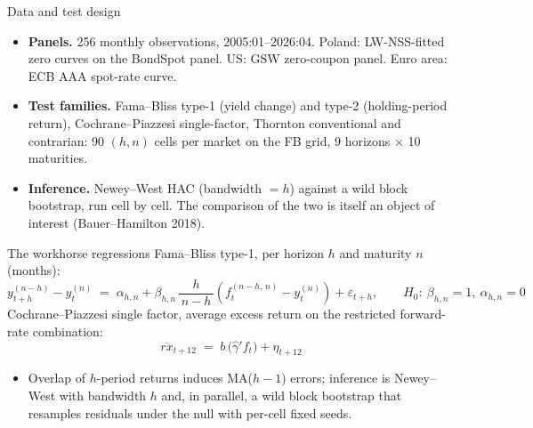 \documentclass[aspectratio=169,11pt]{beamer}
\begin{document}
\begin{frame}{Data and test design}
  \small
  \begin{itemize}
    \item \textbf{Panels.} 256 monthly observations, 2005:01--2026:04. Poland:
          LW-NSS-fitted zero curves on the BondSpot panel. US: GSW zero-coupon
          panel. Euro area: ECB AAA spot-rate curve.
    \item \textbf{Test families.} Fama--Bliss type-1 (yield change) and type-2
          (holding-period return), Cochrane--Piazzesi single-factor,
          Thornton conventional and contrarian: 90 $(h,n)$ cells per market on
          the FB grid, 9 horizons $\times$ 10 maturities.
    \item \textbf{Inference.} Newey--West HAC (bandwidth $=h$) against a wild
          block bootstrap, run cell by cell. The comparison of the two is
          itself an object of interest (Bauer--Hamilton 2018).
  \end{itemize}
\end{frame}

\begin{frame}{The workhorse regressions}
  \small Fama--Bliss type-1, per horizon $h$ and maturity $n$ (months):
  \[ y^{(n-h)}_{t+h} - y^{(n)}_t \;=\; \alpha_{h,n}
     + \beta_{h,n}\,\frac{h}{\,n-h\,}\left(f^{(n-h,\,n)}_t - y^{(n)}_t\right)
     + \varepsilon_{t+h},
     \qquad H_0\!:\ \beta_{h,n}=1,\ \alpha_{h,n}=0 \]
  Cochrane--Piazzesi single factor, average excess return on the restricted
  forward-rate combination:
  \[ \overline{rx}_{t+12} \;=\; b\,\big(\hat\gamma' f_t\big) + \eta_{t+12} \]
  \begin{itemize}
    \item Overlap of $h$-period returns induces MA($h{-}1$) errors; inference
          is Newey--West with bandwidth $h$ and, in parallel, a wild block
          bootstrap that resamples residuals under the null with per-cell
          fixed seeds.
  \end{itemize}
\end{frame}
\end{document}

